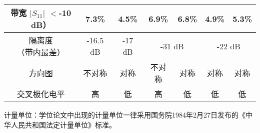 $$\begin{table}
\begin{tabular}{|c|c|c|c|c|c|c|}
\makecell[c]{带宽 \\ $|S_{11}|$ $<$-10 dB）}& 7.3\% & 4.5\% & 6.9\% & 6.8\% & 4.9\% & 5.3\% \\
\hline
\makecell[c]{隔离度\\（带内最差）} & -16.5 dB & -17 dB & \multicolumn{2}{c|}{-31 dB} & \multicolumn{2}{c|}{-22 dB} \\
\hline
方向图 & 不对称 & 对称 & 不对称 & 对称 & 对称 & 对称 \\
\hline
交叉极化电平 & 高 & 低 & 高 & 低 & 低 &低 \\
\hline
\end{tabular}
\end{table}
\par
计量单位：学位论文中出现的计量单位一律采用国务院1984年2月27日发布的《中华人民共和国法定计量单位》标准。
